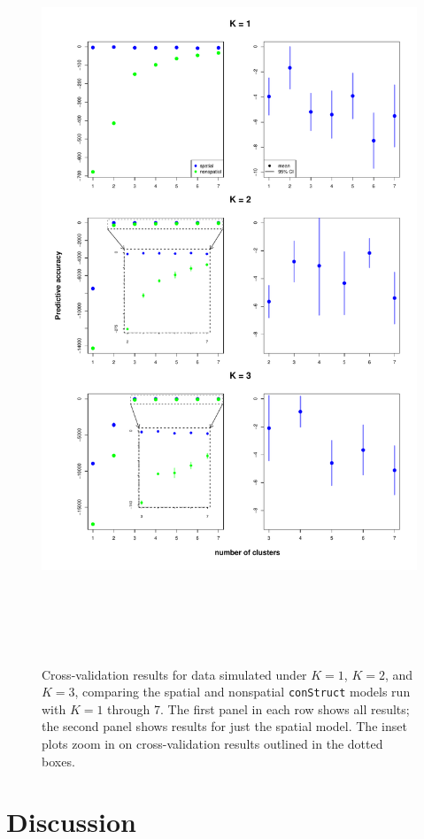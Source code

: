\documentclass[12pt]{article}
\begin{document}
\begin{figure}
	\centering
		{\includegraphics[width=6in,height=8.5in]{figs/sims/xvals.pdf}}
	\caption{
	Cross-validation results for data simulated under $K=1$, $K=2$, and $K=3$, 
	comparing the spatial and nonspatial \texttt{conStruct} models run with $K=1$ through 7.  
	The first panel in each row shows all results; 
	the second panel shows results for just the spatial model.
	The inset plots zoom in on cross-validation results outlined in the dotted boxes.
    }\label{xvals}
\end{figure}


\section*{Discussion}
\end{document}
